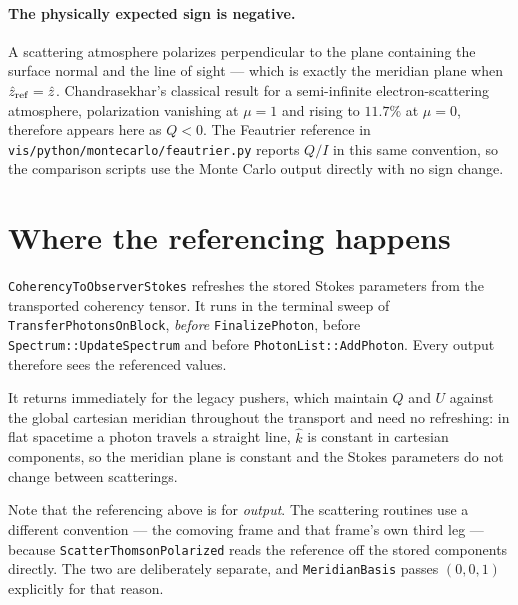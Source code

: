 \documentclass[11pt]{article}
\newcommand{\zref}{\hat{z}_{\rm ref}}
\newcommand{\khat}{\hat{k}}
\begin{document}
\paragraph{The physically expected sign is negative.} A scattering atmosphere polarizes
perpendicular to the plane containing the surface normal and the line of sight --- which is
exactly the meridian plane when $\zref = \hat{z}$. Chandrasekhar's classical result for a
semi-infinite electron-scattering atmosphere, polarization vanishing at $\mu=1$ and rising to
$11.7\%$ at $\mu = 0$, therefore appears here as $Q<0$. The Feautrier reference in
\texttt{vis/python/montecarlo/feautrier.py} reports $Q/I$ in this same convention, so the
comparison scripts use the Monte Carlo output directly with no sign change.

\section{Where the referencing happens}

\texttt{CoherencyToObserverStokes} refreshes the stored Stokes parameters from the
transported coherency tensor. It runs in the terminal sweep of
\texttt{TransferPhotonsOnBlock}, \emph{before} \texttt{FinalizePhoton}, before
\texttt{Spectrum::UpdateSpectrum} and before \texttt{PhotonList::AddPhoton}. Every output
therefore sees the referenced values.

It returns immediately for the legacy pushers, which maintain $Q$ and $U$ against the global
cartesian meridian throughout the transport and need no refreshing: in flat spacetime a
photon travels a straight line, $\khat$ is constant in cartesian components, so the meridian
plane is constant and the Stokes parameters do not change between scatterings.

Note that the referencing above is for \emph{output}. The scattering routines use a different
convention --- the comoving frame and that frame's own third leg --- because
\texttt{ScatterThomsonPolarized} reads the reference off the stored components directly. The
two are deliberately separate, and \texttt{MeridianBasis} passes $(0,0,1)$ explicitly for
that reason.
\end{document}
